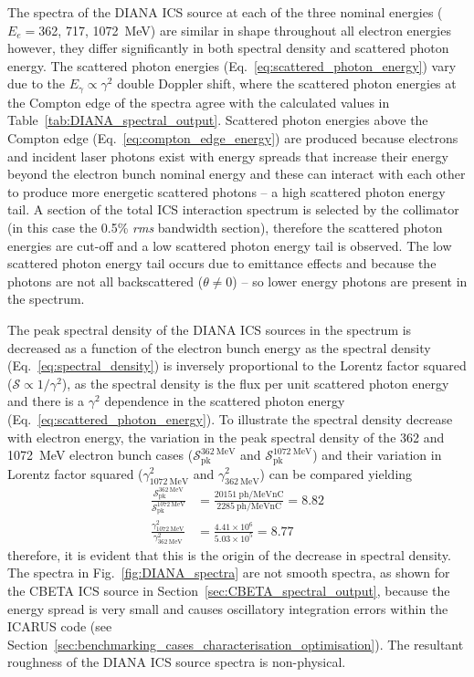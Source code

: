 \documentclass[../main.tex]{subfiles}
\begin{document}
The spectra of the DIANA ICS source at each of the three nominal energies ($E_{e} = $362, 717, 1072~\si{\mega\electronvolt}) are similar in shape throughout all electron energies however, they differ significantly in both spectral density and scattered photon energy. The scattered photon energies (Eq.~\ref{eq:scattered_photon_energy}) vary due to the $E_{\gamma}\propto\gamma^{2}$ double Doppler shift, where the scattered photon energies at the Compton edge of the spectra agree with the calculated values in Table~\ref{tab:DIANA_spectral_output}. Scattered photon energies above the Compton edge (Eq.~\ref{eq:compton_edge_energy}) are produced because electrons and incident laser photons exist with energy spreads that increase their energy beyond the electron bunch nominal energy and these can interact with each other to produce more energetic scattered photons -- a high scattered photon energy tail. A section of the total ICS interaction spectrum is selected by the collimator (in this case the 0.5\% \textit{rms} bandwidth section), therefore the scattered photon energies are cut-off and a low scattered photon energy tail is observed. The low scattered photon energy tail occurs due to emittance effects and because the photons are not all backscattered ($\theta\neq 0$) -- so lower energy photons are present in the spectrum.   

The peak spectral density of the DIANA ICS sources in the spectrum is decreased as a function of the electron bunch energy as the spectral density (Eq.~\ref{eq:spectral_density}) is inversely proportional to the Lorentz factor squared ($\mathcal{S} \propto 1/\gamma^{2}$), as the spectral density is the flux per unit scattered photon energy and there is a $\gamma^{2}$ dependence in the scattered photon energy (Eq.~\ref{eq:scattered_photon_energy}). To illustrate the spectral density decrease with electron energy, the variation in the peak spectral density of the 362 and 1072~\si{\mega\electronvolt} electron bunch cases ($\mathcal{S}_{\mathrm{pk}}^{362~\si{\mega\electronvolt}}$ and $\mathcal{S}_{\mathrm{pk}}^{1072~\si{\mega\electronvolt}}$) and their variation in Lorentz factor squared ($\gamma^{2}_{1072~\si{\mega\electronvolt}}$ and $\gamma^{2}_{362~\si{\mega\electronvolt}}$) can be compared yielding
\begin{align}
\frac{\mathcal{S}_{\mathrm{pk}}^{362~\si{\mega\electronvolt}}}{\mathcal{S}_{\mathrm{pk}}^{1072~\si{\mega\electronvolt}}} &= \frac{20151~\mathrm{ph}/\si{\mega\electronvolt\nano\coulomb}} {2285~\mathrm{ph}/\si{\mega\electronvolt\nano\coulomb}} = 8.82 \nonumber\\
\frac{\gamma_{1072~\si{\mega\electronvolt}}^{2}}{\gamma_{362~\si{\mega\electronvolt}}^{2}} &= \frac{4.41\times 10^{6}}{5.03\times 10^{5}} = 8.77 \nonumber
\end{align}
therefore, it is evident that this is the origin of the decrease in spectral density. The spectra in Fig.~\ref{fig:DIANA_spectra} are not smooth spectra, as shown for the CBETA ICS source in Section~\ref{sec:CBETA_spectral_output}, because the energy spread is very small and causes oscillatory integration errors within the \textsc{ICARUS} code (see Section~\ref{sec:benchmarking_cases_characterisation_optimisation}). The resultant roughness of the DIANA ICS source spectra is non-physical.
\end{document}
